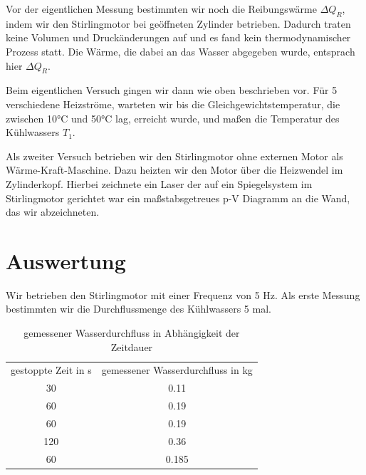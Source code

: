\documentclass[a4paper, 12pt,]{scrartcl}
\begin{document}
Vor der eigentlichen Messung bestimmten wir noch die Reibungswärme $\Delta{Q_R}$, indem wir den Stirlingmotor bei geöffneten Zylinder betrieben. Dadurch traten keine Volumen und Druckänderungen auf und es fand kein thermodynamischer Prozess statt. Die Wärme, die dabei an das Wasser abgegeben wurde, entsprach hier $\Delta{Q_R}$.

Beim eigentlichen Versuch gingen wir dann wie oben beschrieben vor. Für 5 verschiedene Heizströme, warteten wir bis die Gleichgewichtstemperatur, die zwischen 10°C und 50°C lag, erreicht wurde, und maßen die Temperatur des Kühlwassers $T_1$.

Als zweiter Versuch betrieben wir den Stirlingmotor ohne externen Motor als Wärme-Kraft-Maschine. Dazu heizten wir den Motor über die Heizwendel im Zylinderkopf. Hierbei zeichnete ein Laser der auf ein Spiegelsystem im Stirlingmotor gerichtet war ein maßstabsgetreues p-V Diagramm an die Wand, das wir abzeichneten.

\section{Auswertung}
Wir betrieben den Stirlingmotor mit einer Frequenz von 5 Hz. Als erste Messung bestimmten wir die Durchflussmenge des Kühlwassers 5 mal.
\begin{table}[H]\centering\begin{tabular}{cc}gestoppte Zeit in s&gemessener Wasserdurchfluss in kg\\30&0.11\\60&0.19\\60&0.19\\120&0.36\\60&0.185\end{tabular}\caption{gemessener Wasserdurchfluss in Abhängigkeit der Zeitdauer}\end{table}
\end{document}
